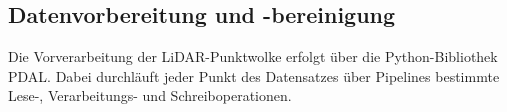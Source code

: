 \subsection{Datenvorbereitung und -bereinigung}

Die Vorverarbeitung der LiDAR-Punktwolke erfolgt über die Python-Bibliothek PDAL. Dabei durchläuft jeder Punkt des Datensatzes über Pipelines bestimmte Lese-, Verarbeitungs- und Schreiboperationen. 